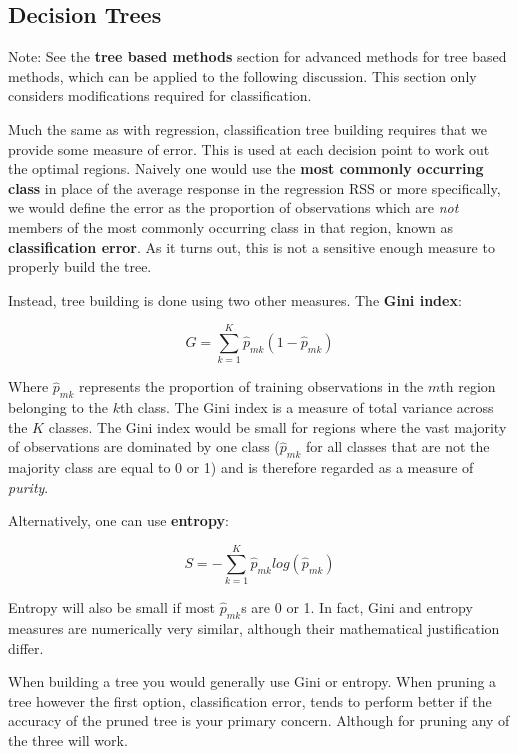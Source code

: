 \subsection{Decision Trees}

Note: See the \textbf{tree based methods} section for advanced methods for tree based methods, which can be applied to the following discussion. This section only considers modifications required for classification.

Much the same as with regression, classification tree building requires that we provide some measure of error. This is used at each decision point to work out the optimal regions. Naively one would use the \textbf{most commonly occurring class} in place of the average response in the regression RSS or more specifically, we would define the error as the proportion of observations which are \textit{not} members of the most commonly occurring class in that region, known as \textbf{classification error}. As it turns out, this is not a sensitive enough measure to properly build the tree.

Instead, tree building is done using two other measures. The \textbf{Gini index}:

$$ G=\sum^{K}_{k=1}\hat{p}_{mk}(1-\hat{p}_{mk}) $$

Where $\hat{p}_{mk}$ represents the proportion of training observations in the $m$th region belonging to the $k$th class. The Gini index is a measure of total variance across the $K$ classes. The Gini index would be small for regions where the vast majority of observations are dominated by one class ($\hat{p}_{mk}$ for all classes that are not the majority class are equal to 0 or 1) and is therefore regarded as a measure of \textit{purity}.

Alternatively, one can use \textbf{entropy}:

$$ S = -\sum^{K}_{k=1}\hat{p}_{mk}log(\hat{p}_{mk}) $$

Entropy will also be small if most $\hat{p}_{mk}$s are 0 or 1. In fact, Gini and entropy measures are numerically very similar, although their mathematical justification differ.

When building a tree you would generally use Gini or entropy. When pruning a tree however the first option, classification error, tends to perform better if the accuracy of the pruned tree is your primary concern. Although for pruning any of the three will work.
